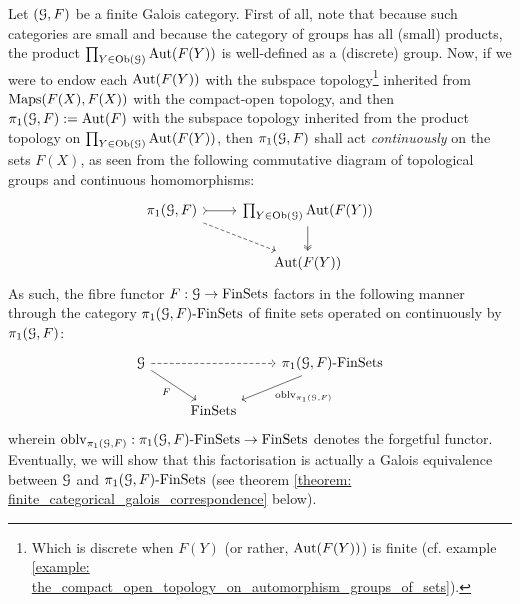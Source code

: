             \begin{remark} \label{remark: action_of_fundamental_groups_on_fibres_finite_galois_categories}
                Let $(\mathcal{G}, F)$ be a finite Galois category. First of all, note that because such categories are small and because the category of groups has all (small) products, the product $\prod_{Y \in \mathrm{Ob}(\mathcal{G})} \mathrm{Aut}(F(Y))$ is well-defined as a (discrete) group. Now, if we were to endow each $\mathrm{Aut}(F(Y))$ with the subspace topology\footnote{Which is discrete when $F(Y)$ (or rather, $\mathrm{Aut}(F(Y))$) is finite (cf. example \ref{example: the_compact_open_topology_on_automorphism_groups_of_sets}).} inherited from $\mathrm{Maps}(F(X), F(X))$ with the compact-open topology, and then $\pi_1(\mathcal{G}, F) := \mathrm{Aut}(F)$ with the subspace topology inherited from the product topology on $\prod_{Y \in \mathrm{Ob}(\mathcal{G})} \mathrm{Aut}(F(Y))$, then $\pi_1(\mathcal{G}, F)$ shall act \textit{continuously} on the sets $F(X)$, as seen from the following commutative diagram of topological groups and continuous homomorphisms:
                    $$
                        \begin{tikzcd}
                        	{\pi_1(\calG, F)} & {\prod_{Y \in \Ob(\calG)} \Aut(F(Y))} \\
                        	& {\Aut(F(Y))}
                        	\arrow[tail, from=1-1, to=1-2]
                        	\arrow[two heads, from=1-2, to=2-2]
                        	\arrow[dashed, from=1-1, to=2-2]
                        \end{tikzcd}
                    $$
                As such, the fibre functor $F: \mathcal{G} \to \mathrm{Fin}\mathrm{Sets}$ factors in the following manner through the category $\pi_1(\mathcal{G}, F)\text{-}\mathrm{Fin}\mathrm{Sets}$ of finite sets operated on continuously by $\pi_1(\mathcal{G}, F)$:
                    $$
                        \begin{tikzcd}
                        	\calG && {\pi_1(\calG, F)\-\Fin\Sets} \\
                        	& \Fin\Sets
                        	\arrow[dashed, from=1-1, to=1-3]
                        	\arrow["F"', from=1-1, to=2-2]
                        	\arrow["{\oblv_{\pi_1(\calG, F)}}", from=1-3, to=2-2]
                        \end{tikzcd}
                    $$
                wherein $\mathrm{oblv}_{\pi_1(\mathcal{G}, F)}: \pi_1(\mathcal{G}, F)\text{-}\mathrm{Fin}\mathrm{Sets} \to \mathrm{Fin}\mathrm{Sets}$ denotes the forgetful functor. Eventually, we will show that this factorisation is actually a Galois equivalence between $\mathcal{G}$ and $\pi_1(\mathcal{G}, F)\text{-}\mathrm{Fin}\mathrm{Sets}$ (see theorem \ref{theorem: finite_categorical_galois_correspondence} below).
            \end{remark}
